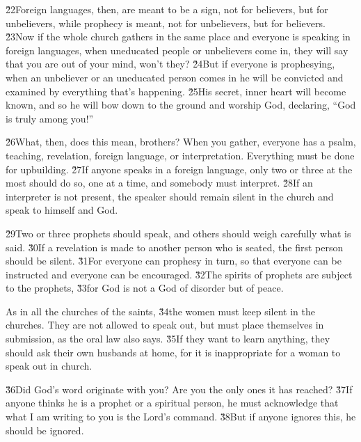 \v{22}Foreign languages, then, are meant to be a sign, not for believers, but for unbelievers, while prophecy is meant, not for unbelievers, but for believers. \v{23}Now if the whole church gathers in the same place and everyone is speaking in foreign languages, when uneducated people or unbelievers come in, they will say that you are out of your mind, won't they? \v{24}But if everyone is prophesying, when an unbeliever or an uneducated person comes in he will be convicted and examined by everything that's happening. \v{25}His secret, inner heart will become known, and so he will bow down to the ground and worship God, declaring, ``God is truly among you!''

\v{26}What, then, does this mean, brothers? When you gather, everyone has a psalm, teaching, revelation, foreign language, or interpretation. Everything must be done for upbuilding. \v{27}If anyone speaks in a foreign language, only two or three at the most should do so, one at a time, and somebody must interpret. \v{28}If an interpreter is not present, the speaker should remain silent in the church and speak to himself and God.

\v{29}Two or three prophets should speak, and others should weigh carefully what is said. \v{30}If a revelation is made to another person who is seated, the first person should be silent. \v{31}For everyone can prophesy in turn, so that everyone can be instructed and everyone can be encouraged. \v{32}The spirits of prophets are subject to the prophets, \v{33}for God is not a God of disorder but of peace.

As in all the churches of the saints, \v{34}the women must keep silent in the churches. They are not allowed to speak out, but must place themselves in submission, as the oral law also says. \v{35}If they want to learn anything, they should ask their own husbands at home, for it is inappropriate for a woman to speak out in church.

\v{36}Did God's word originate with you? Are you the only ones it has reached? \v{37}If anyone thinks he is a prophet or a spiritual person, he must acknowledge that what I am writing to you is the Lord's command. \v{38}But if anyone ignores this, he should be ignored.


